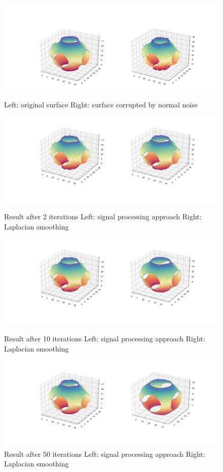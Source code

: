 \documentclass[conference]{IEEEtran}
\begin{document}
\begin{figure}
	\includegraphics[width=\linewidth]{1.png}
	\caption{Left: original surface \space Right: surface corrupted by normal noise}
	\label{1png}

	\includegraphics[width=\linewidth]{2.png}
	\caption{Result after 2 iterations \newline Left: signal processing approach \space Right: Laplacian smoothing}
	\label{2png}

	\includegraphics[width=\linewidth]{3.png}
	\caption{Result after 10 iterations \newline Left: signal processing approach \space Right: Laplacian smoothing}
	\label{3png}

	\includegraphics[width=\linewidth]{4.png}
	\caption{Result after 50 iterations \newline Left: signal processing approach \space Right: Laplacian smoothing}
	\label{4png}
\end{figure}
\end{document}
